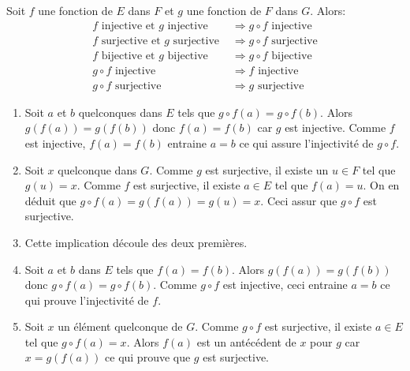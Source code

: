 \begin{propn}\label{condinjsurj}
Soit $f$ une fonction de $E$ dans $F$ et $g$ une fonction de $F$ dans $G$. Alors:
 \begin{align}
  f \text{ injective et } g \text{ injective } &\Rightarrow g\circ f \text{ injective} \\
  f \text{ surjective et } g \text{ surjective } &\Rightarrow g\circ f \text{ surjective} \\
  f \text{ bijective et } g \text{ bijective } &\Rightarrow g\circ f \text{ bijective} \\
  g\circ f \text{ injective } &\Rightarrow f \text{ injective} \\
  g\circ f \text{ surjective } &\Rightarrow g \text{ surjective} 
 \end{align}
\end{propn}
\begin{demo}
\begin{enumerate}
 \item Soit $a$ et $b$ quelconques dans $E$ tels que $g\circ f(a)= g\circ f(b)$. Alors $g(f(a)) = g(f(b))$ donc $f(a) = f(b)$ car $g$ est injective. Comme $f$ est injective, $f(a) = f(b)$ entraine $a = b$ ce qui assure l'injectivité de $g\circ f$.  
 \item Soit $x$ quelconque dans $G$. Comme $g$ est surjective, il existe un $u\in F$ tel que $g(u) = x$. Comme $f$ est surjective, il existe $a\in E$ tel que $f(a)=u$. On en déduit que $g\circ f (a) = g(f(a)) = g(u) = x$. Ceci assur que $g\circ f$ est surjective. 
 \item Cette implication découle des deux premières.
 \item Soit $a$ et $b$ dans $E$ tels que $f(a) = f(b)$. Alors $g(f(a)) = g(f(b))$ donc $g \circ f (a) = g\circ f(b)$. Comme $g\circ f$ est injective, ceci entraine $a=b$ ce qui prouve l'injectivité de $f$.
 \item Soit $x$ un élément quelconque de $G$. Comme $g\circ f$ est surjective, il existe $a\in E$ tel que $g\circ f(a) =x$. Alors $f(a)$ est un antécédent de $x$ pour $g$ car $x = g(f(a))$ ce qui prouve que $g$ est surjective.
\end{enumerate}

\end{demo}

